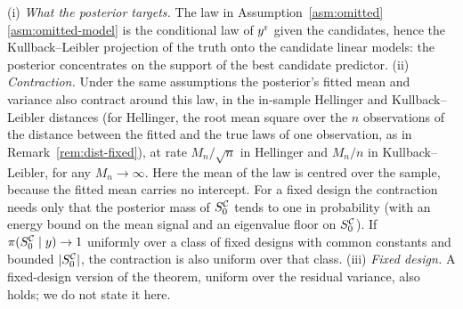 \begin{remark}\label{rem:omitted-cons}
(i) \emph{What the posterior targets.} The law in Assumption~\ref{asm:omitted}\ref{asm:omitted-model} is the conditional
law of $y^{\mathrm r}$ given the candidates, hence the Kullback--Leibler projection of the truth onto the candidate linear models:
the posterior concentrates on the support of the best candidate predictor.
(ii) \emph{Contraction.} Under the same assumptions the posterior's fitted mean and variance also contract around this
law, in the in-sample Hellinger and Kullback--Leibler distances (for Hellinger, the root mean square over the $n$
observations of the distance between the fitted and the true laws of one observation, as in
Remark~\ref{rem:dist-fixed}), at rate $M_n/\sqrt n$ in Hellinger and $M_n/n$
in Kullback--Leibler, for any $M_n\to\infty$. Here the mean of the law is centred over the sample, because the fitted mean
carries no intercept.
For a fixed design the contraction needs only that the posterior mass of $S_0^{\mathcal C}$ tends to one in probability
(with an energy bound on the mean signal and an eigenvalue floor on $S_0^{\mathcal C}$). If $\pi(S_0^{\mathcal C}\mid y)\to1$
uniformly over a class of fixed designs with common constants and bounded $\lvert S_0^{\mathcal C}\rvert$, the contraction is also
uniform over that class.
(iii) \emph{Fixed design.} A fixed-design version of the theorem, uniform over the residual variance, also holds; we do
not state it here.
\end{remark}


